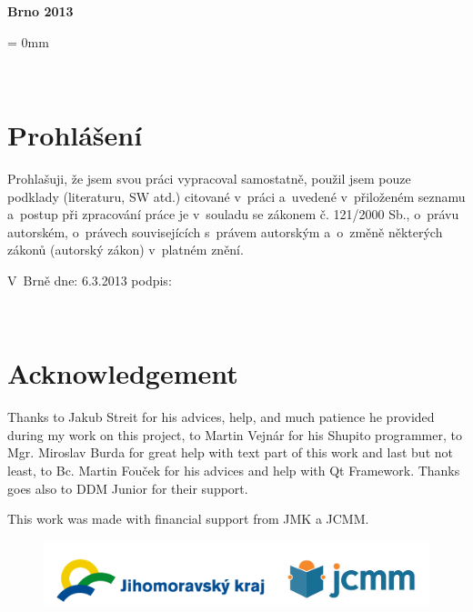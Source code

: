 \documentclass[12pt, a4paper, oneside]{article}
\newcommand{\D}{\medskip \noindent} %
\newcommand{\B}{\textbf} %
\begin{document}
\vspace{20mm}

\begin{center}
\B{Brno 2013}

\end{center}
\normalsize
\newpage  %
\voffset = 0mm %

~ %

\vspace{10mm}

\section*{Prohlášení}

Prohlašuji, že jsem svou práci vypracoval samostatně, použil jsem pouze 
podklady (literaturu, SW atd.) citované v~práci a~uvedené v~přiloženém seznamu 
a~postup při zpracování práce je v~souladu se zákonem č. 121/2000 Sb., o~právu 
autorském, o~právech souvisejících s~právem autorským a~o~změně některých 
zákonů (autorský zákon) v~platném znění. 
 
\vspace{20mm} 
 
\noindent V~Brně  dne: 6.3.2013 \hspace{50mm}                 podpis:   
 

\newpage   %

~ %
\vspace{100mm}

\section*{Acknowledgement}
Thanks to Jakub Streit for his advices, help, and much patience he provided during my work on this project, to Martin Vejnár for his Shupito programmer, to Mgr. Miroslav Burda for great help with text part of this work and last but not least, to Bc. Martin Fouček for his advices and help with Qt Framework. Thanks goes also to DDM Junior for their support.

\D This work was made with financial support from JMK a JCMM.

\begin{figure}[H]
\begin{center}
\includegraphics[width=\textwidth]{img/jcmm.png}
\end{center}
\end{figure}
 
\end{document}
